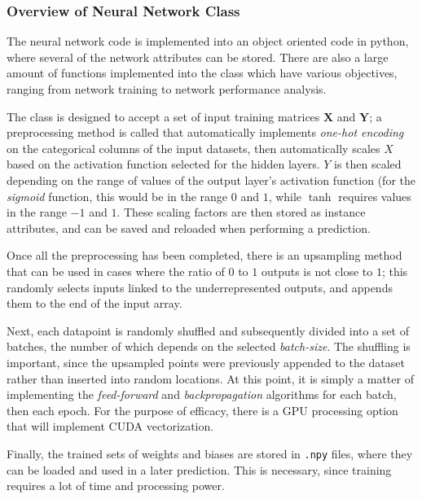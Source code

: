         \subsubsection*{Overview of Neural Network Class}
        
The neural network code is implemented into an object oriented code in python, where several of the network attributes can be stored. There are also a large amount of functions implemented into the class which have various objectives, ranging from network training to network performance analysis. 
            
            The class is designed to accept a set of input training matrices $\mathbf{X}$ and $\mathbf{Y}$; a preprocessing method is called that automatically implements \textit{one-hot encoding} on the categorical columns of the input datasets, then automatically scales $X$ based on the activation function selected for the hidden layers.  $Y$ is then scaled depending on the range of values of the output layer's activation function (for the \textit{sigmoid} function, this would be in the range $0$ and $1$, while $\tanh$ requires values in the range $-1$ and $1$.  These scaling factors are then stored as instance attributes, and can be saved and reloaded when performing a prediction.
            
            Once all the preprocessing has been completed, there is an upsampling method that can be used in cases where the ratio of $0$ to $1$ outputs is not close to $1$; this randomly selects inputs linked to the underrepresented outputs, and appends them to the end of the input array.
            
            Next, each datapoint is randomly shuffled and subsequently divided into a set of batches, the number of which depends on the selected \textit{batch-size}.  The shuffling is important, since the upsampled points were previously appended to the dataset rather than inserted into random locations.  At this point, it is simply a matter of implementing the \textit{feed-forward} and \textit{backpropagation} algorithms for each batch, then each epoch.  For the purpose of efficacy, there is a GPU processing option that will implement CUDA vectorization.
            
            Finally, the trained sets of weights and biases are stored in \texttt{.npy} files, where they can be loaded and used in a later prediction.  This is necessary, since training requires a lot of time and processing power.
        
